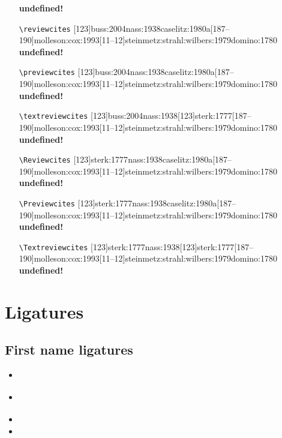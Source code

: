 \documentclass[a4paper,12pt]{scrartcl}
\newcommand*{\Befehl}[1]{\texttt{\textbackslash#1}}
\begin{document}
\begin{enumerate}
        {\textbf{undefined!}}%
	\item[\footnotesize\Befehl{reviewcites}] 
        {[123]{buss:2004}{nass:1938}{caselitz:1980a}[187--190]{molleson:cox:1993}[11--12]{steinmetz:strahl:wilbers:1979}{domino:1780}}
        {\textbf{undefined!}}%
	\item[\footnotesize\Befehl{previewcites}] 
        {[123]{buss:2004}{nass:1938}{caselitz:1980a}[187--190]{molleson:cox:1993}[11--12]{steinmetz:strahl:wilbers:1979}{domino:1780}}
        {\textbf{undefined!}}%
	\item[\footnotesize\Befehl{textreviewcites}] 
        {[123]{buss:2004}{nass:1938}[123]{sterk:1777}[187--190]{molleson:cox:1993}[11--12]{steinmetz:strahl:wilbers:1979}{domino:1780}}
        {\textbf{undefined!}}%
	\item[\footnotesize\Befehl{Reviewcites}] 
        {[123]{sterk:1777}{nass:1938}{caselitz:1980a}[187--190]{molleson:cox:1993}[11--12]{steinmetz:strahl:wilbers:1979}{domino:1780}}
        {\textbf{undefined!}}%
	\item[\footnotesize\Befehl{Previewcites}] 
        {[123]{sterk:1777}{nass:1938}{caselitz:1980a}[187--190]{molleson:cox:1993}[11--12]{steinmetz:strahl:wilbers:1979}{domino:1780}}
        {\textbf{undefined!}}%
	\item[\footnotesize\Befehl{Textreviewcites}] 
        {[123]{sterk:1777}{nass:1938}[123]{sterk:1777}[187--190]{molleson:cox:1993}[11--12]{steinmetz:strahl:wilbers:1979}{domino:1780}}
        {\textbf{undefined!}}%
\end{enumerate}


\section{Ligatures}

\subsection{First name ligatures}
\begin{itemize}
    \item\cite{test::firstnames::2}%
    \item\cite{test::firstnames::1}%
    \item{}%
    \item{}%
\end{itemize}
\end{document}
